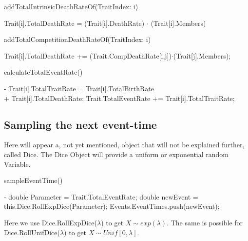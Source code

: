 \documentclass{article}
\begin{document}
\begin{algorithm}[H]
	\caption{addTotalIntrinsicDeathRateOf(TraitIndex: i)}
	\begin{algorithmic}[1]
		\STATE Trait[i].TotalDeathRate = (Trait[i].DeathRate) $\cdot$ (Trait[i].Members)
	\end{algorithmic}
\end{algorithm}
\begin{algorithm}[H]
	\caption{addTotalCompetitionDeathRateOf(TraitIndex: i)}
	\begin{algorithmic}[1]
			\STATE Trait[i].TotalDeathRate += (Trait.CompDeathRate[i,j])$\cdot$(Trait[j].Members);
		\ENDFOR
	\end{algorithmic}
\end{algorithm}

\begin{algorithm}[H]
	\caption{calculateTotalEventRate()}
	\begin{algorithmic}[1]
		\REQUIRE -
			\STATE Trait[i].TotalTraitRate = Trait[i].TotalBirthRate \\ 
			\noindent\hspace*{36mm}+ Trait[i].TotalDeathRate;
			\STATE Trait.TotalEventRate += Trait[i].TotalTraitRate;
		\ENDFOR
	\end{algorithmic}
\end{algorithm}

\subsection{Sampling the next event-time}
Here will appear a, not yet mentioned, object that will not be explained further, called Dice. The Dice Object will provide a uniform or exponential random Variable.\\
\begin{algorithm}[H]
	\caption{sampleEventTime()}
	\begin{algorithmic}[1]
		\REQUIRE -
		\STATE double Parameter = Trait.TotalEventRate;
		\STATE double newEvent = this.Dice.RollExpDice(Parameter);
		\STATE Events.EventTimes.push(newEvent);
	\end{algorithmic}
\end{algorithm}
Here we use Dice.RollExpDice($\lambda$) to get $X\sim exp(\lambda)$. The same is possible for  Dice.RollUnifDice($\lambda$) to get $X\sim Unif[0,\lambda]$.\\
\end{document}
